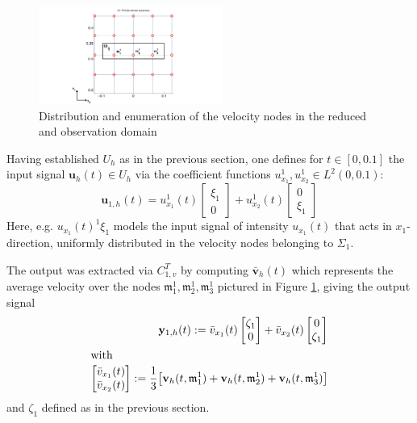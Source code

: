 \documentclass[a4paper,10pt,BCOR=15mm]{scrbook}
\begin{document}
\begin{figure}[htbp]
  \centering
  \begin{minipage}[b]{6 cm}
    \includegraphics[width=6cm]{pics/numex/theta1s.pdf}
  \end{minipage}
  \caption{Distribution and enumeration of the velocity nodes in the reduced and observation domain}
  \label{sigthe1}
\end{figure}

Having established $U_h$ as in the previous section, one defines for $t \in [0,0.1]$ the input signal $\mathbf u_h(t) \in U_h$ via the coefficient functions $u_{x_1}^1,u_{x_2}^1 \in L^2(0,0.1)$:
\begin{equation*}
 \mathbf u_{1,h}(t) = u_{x_1}^1(t)\begin{bmatrix} \xi_1 \\ 0 \end{bmatrix}+u_{x_2}^1(t)\begin{bmatrix}0 \\ \xi_1 \end{bmatrix}
\end{equation*}
Here, e.g. $u_{x_1}(t)^1 \xi_1$ models the input signal of intensity $u_{x_1}(t)$ that acts in $x_1$-direction, uniformly distributed in the velocity nodes belonging to $\Sigma_1$.

The output was extracted via $C_{1,v}^T$ by computing $\bar{ \mathbf v}_h(t)$ which represents the average velocity over the nodes $ \mathfrak m_1^1,\mathfrak m_2^1,\mathfrak m_3^1$ pictured in Figure \ref{sigthe1}, giving the output signal
\begin{align*}
  \mathbf y_{1,h}(t) := \bar v_{x_1}(t)\begin{bmatrix} \zeta_1 \\ 0 \end{bmatrix} + \bar v_{x_2}(t)\begin{bmatrix}0\\ \zeta_1 \end{bmatrix}\\
\intertext{with}
\begin{bmatrix}\bar v_{x_1}(t) \\ \bar v_{x_2}(t) \end{bmatrix} := \frac{1}{3} \bigl [ \mathbf v_h(t, \mathfrak m_1^1)+\mathbf v_h(t, \mathfrak m_2^1)+\mathbf v_h(t, \mathfrak m_3^1) \bigr ]
\end{align*}
and $\zeta_1$ defined as in the previous section.
\end{document}
